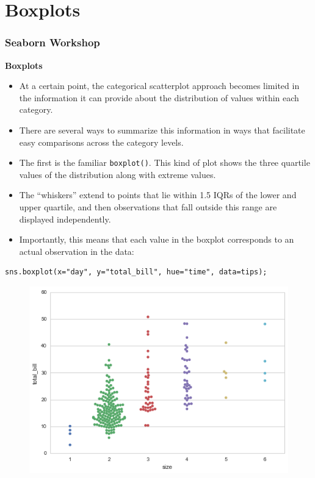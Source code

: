 \documentclass{beamer}
\begin{document}
\section{Boxplots}
\begin{frame}[fragile]
\frametitle{Seaborn Workshop}
\large
\noindent \textbf{Boxplots}\\
\begin{itemize}
\item At a certain point, the categorical scatterplot approach becomes limited in the information it can provide about the distribution of values within each category. 
\item There are several ways to summarize this information in ways that facilitate easy comparisons across the category levels.
\end{itemize}

\end{frame}
\begin{frame}[fragile]
\large
	\begin{itemize}
\item The first is the familiar \texttt{boxplot()}. This kind of plot shows the three quartile values of the distribution along with extreme values.
\item The “whiskers” extend to points that lie within 1.5 IQRs of the lower and upper quartile, and then observations that fall outside this range are displayed independently. 
\item Importantly, this means that each value in the boxplot corresponds to an actual observation in the data:
	\end{itemize}

\end{frame}
\begin{frame}[fragile]
\begin{verbatim}
sns.boxplot(x="day", y="total_bill", hue="time", data=tips);
\end{verbatim}
\begin{figure}
	\centering
	\includegraphics[width=0.7\linewidth]{images/categorical_17_0}
\end{figure}
\end{frame}
\end{document}
